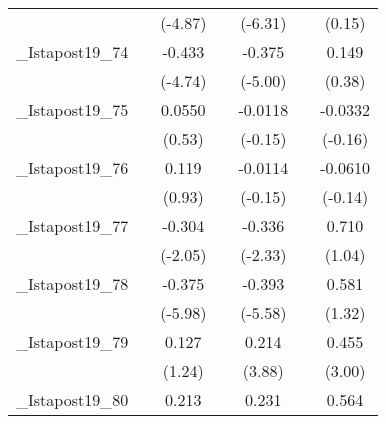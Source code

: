 {\begin{tabular}{l*{6}{c}}
            &                     &     (-4.87)         &                     &     (-6.31)         &                     &      (0.15)         \\
[1em]
\_Istapost19\_74&                     &      -0.433\sym{***}&                     &      -0.375\sym{***}&                     &       0.149         \\
            &                     &     (-4.74)         &                     &     (-5.00)         &                     &      (0.38)         \\
[1em]
\_Istapost19\_75&                     &      0.0550         &                     &     -0.0118         &                     &     -0.0332         \\
            &                     &      (0.53)         &                     &     (-0.15)         &                     &     (-0.16)         \\
[1em]
\_Istapost19\_76&                     &       0.119         &                     &     -0.0114         &                     &     -0.0610         \\
            &                     &      (0.93)         &                     &     (-0.15)         &                     &     (-0.14)         \\
[1em]
\_Istapost19\_77&                     &      -0.304\sym{*}  &                     &      -0.336\sym{*}  &                     &       0.710         \\
            &                     &     (-2.05)         &                     &     (-2.33)         &                     &      (1.04)         \\
[1em]
\_Istapost19\_78&                     &      -0.375\sym{***}&                     &      -0.393\sym{***}&                     &       0.581         \\
            &                     &     (-5.98)         &                     &     (-5.58)         &                     &      (1.32)         \\
[1em]
\_Istapost19\_79&                     &       0.127         &                     &       0.214\sym{***}&                     &       0.455\sym{**} \\
            &                     &      (1.24)         &                     &      (3.88)         &                     &      (3.00)         \\
[1em]
\_Istapost19\_80&                     &       0.213         &                     &       0.231\sym{*}  &                     &       0.564         \\

\end{tabular}}
